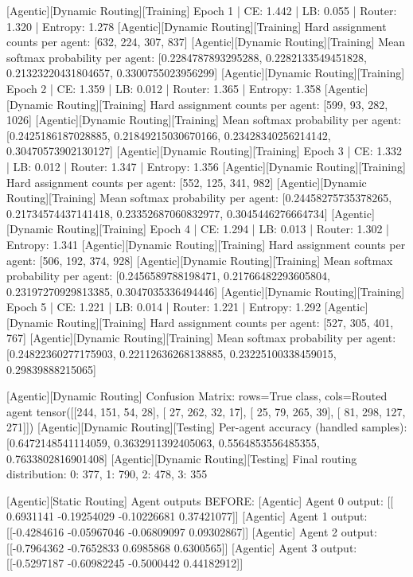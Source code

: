[Agentic][Dynamic Routing][Training] Epoch 1 | CE: 1.442 | LB: 0.055 | Router: 1.320 | Entropy: 1.278
[Agentic][Dynamic Routing][Training] Hard assignment counts per agent: [632, 224, 307, 837]
[Agentic][Dynamic Routing][Training] Mean softmax probability per agent: [0.2284787893295288, 0.2282133549451828, 0.21323220431804657, 0.3300755023956299]
[Agentic][Dynamic Routing][Training] Epoch 2 | CE: 1.359 | LB: 0.012 | Router: 1.365 | Entropy: 1.358
[Agentic][Dynamic Routing][Training] Hard assignment counts per agent: [599, 93, 282, 1026]
[Agentic][Dynamic Routing][Training] Mean softmax probability per agent: [0.2425186187028885, 0.21849215030670166, 0.23428340256214142, 0.30470573902130127]
[Agentic][Dynamic Routing][Training] Epoch 3 | CE: 1.332 | LB: 0.012 | Router: 1.347 | Entropy: 1.356
[Agentic][Dynamic Routing][Training] Hard assignment counts per agent: [552, 125, 341, 982]
[Agentic][Dynamic Routing][Training] Mean softmax probability per agent: [0.24458275735378265, 0.21734574437141418, 0.23352687060832977, 0.3045446276664734]
[Agentic][Dynamic Routing][Training] Epoch 4 | CE: 1.294 | LB: 0.013 | Router: 1.302 | Entropy: 1.341
[Agentic][Dynamic Routing][Training] Hard assignment counts per agent: [506, 192, 374, 928]
[Agentic][Dynamic Routing][Training] Mean softmax probability per agent: [0.2456589788198471, 0.21766482293605804, 0.23197270929813385, 0.3047035336494446]
[Agentic][Dynamic Routing][Training] Epoch 5 | CE: 1.221 | LB: 0.014 | Router: 1.221 | Entropy: 1.292
[Agentic][Dynamic Routing][Training] Hard assignment counts per agent: [527, 305, 401, 767]
[Agentic][Dynamic Routing][Training] Mean softmax probability per agent: [0.24822360277175903, 0.22112636268138885, 0.23225100338459015, 0.29839888215065]

[Agentic][Dynamic Routing] Confusion Matrix: rows=True class, cols=Routed agent
tensor([[244, 151,  54,  28],
[ 27, 262,  32,  17],
[ 25,  79, 265,  39],
[ 81, 298, 127, 271]])
[Agentic][Dynamic Routing][Testing] Per-agent accuracy (handled samples): [0.6472148541114059, 0.3632911392405063, 0.5564853556485355, 0.7633802816901408]
[Agentic][Dynamic Routing][Testing] Final routing distribution: {0: 377, 1: 790, 2: 478, 3: 355}

[Agentic][Static Routing] Agent outputs BEFORE:
[Agentic] Agent 0 output: [[ 0.6931141  -0.19254029 -0.10226681  0.37421077]]
[Agentic] Agent 1 output: [[-0.4284616  -0.05967046 -0.06809097  0.09302867]]
[Agentic] Agent 2 output: [[-0.7964362 -0.7652833  0.6985868  0.6300565]]
[Agentic] Agent 3 output: [[-0.5297187  -0.60982245 -0.5000442   0.44182912]]

